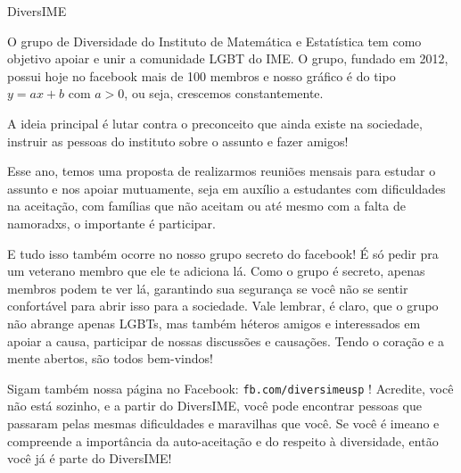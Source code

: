 \begin{subsecao}{DiversIME}

O grupo de Diversidade do Instituto de Matemática e Estatística tem como objetivo
 apoiar e unir a comunidade LGBT do IME. O grupo, fundado em 2012, possui hoje
 no facebook mais de 100 membros e nosso gráfico é do tipo $y = ax + b$ com $a > 0$,
 ou seja, crescemos constantemente.

A ideia principal é lutar contra o preconceito que ainda existe na sociedade,
 instruir as pessoas do instituto sobre o assunto e fazer amigos!

Esse ano, temos uma proposta de realizarmos reuniões mensais para estudar o
 assunto e nos apoiar mutuamente, seja em auxílio a estudantes com dificuldades
 na aceitação, com famílias que não aceitam ou até mesmo com a falta de
 namoradxs, o importante é participar.

E tudo isso também ocorre no nosso grupo secreto do facebook! É só pedir pra um
 veterano membro que ele te adiciona lá. Como o grupo é secreto, apenas membros
 podem te ver lá, garantindo sua segurança se você não se sentir confortável
 para abrir isso para a sociedade. Vale lembrar, é claro, que o grupo não
 abrange apenas LGBTs, mas também héteros amigos e interessados em apoiar
 a causa, participar de nossas discussões e causações. Tendo o coração e a mente
 abertos, são todos bem-vindos!

Sigam também nossa página no Facebook: {\tt fb.com/diversimeusp} !
Acredite, você não está sozinho, e a partir do DiversIME, você pode encontrar
 pessoas que passaram pelas mesmas dificuldades e maravilhas que você. Se você
 é imeano e compreende a importância da auto-aceitação e do respeito à
 diversidade, então você já é parte do DiversIME!

\end{subsecao}
